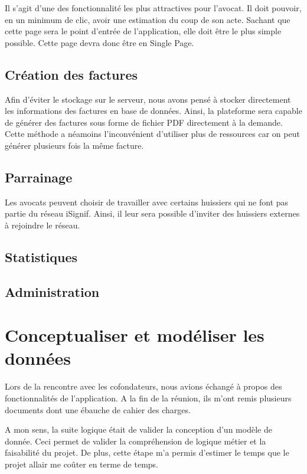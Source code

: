 \documentclass[]{report}
\begin{document}
      Il s'agit d'une des fonctionnalité les plus attractives pour l'avocat. Il doit pouvoir, en un minimum de clic, avoir une estimation du coup de son acte. Sachant que cette page sera le point d'entrée de l'application, elle doit être le plus simple possible. Cette page devra donc être en Single Page.

    \subsection{Création des factures}

      Afin d'éviter le stockage sur le serveur, nous avons pensé à stocker directement les informations des factures en base de données. Ainsi, la plateforme sera capable de générer des factures sous forme de fichier PDF directement à la demande. Cette méthode a néamoins l'inconvénient d'utiliser plus de ressources car on peut générer plusieurs fois la même facture.

    \subsection{Parrainage}

      Les avocats peuvent choisir de travailler avec certains huissiers qui ne font pas partie du réseau iSignif. Ainsi, il leur sera possible d'inviter des huissiers externes à rejoindre le réseau.

    \subsection{Statistiques}


    \subsection{Administration}


  \section{Conceptualiser et modéliser les données}

    Lors de la rencontre avec les cofondateurs, nous avions échangé à propos des fonctionnalités de l'application. A la fin de la réunion, ils m'ont remis plusieurs documents dont une ébauche de cahier des charges.

    A mon sens, la suite logique était de valider la conception d'un modèle de donnée. Ceci permet de valider la compréhension de logique métier et la faisabilité du projet. De plus, cette étape m'a permis d'estimer le temps que le projet allair me coûter en terme de temps.
\end{document}
